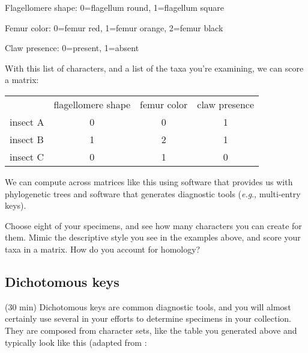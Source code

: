 Flagellomere shape:	0=flagellum round, 1=flagellum square\vspace{3mm}

Femur color: 0=femur red, 1=femur orange, 2=femur black\vspace{3mm}

Claw presence: 0=present, 1=absent\vspace{3mm}

With this list of characters, and a list of the taxa you're examining, we can score a matrix:
\begin{table}[H]
\centering
\label{my-label}
\begin{tabular}{lccc}
                             & \multicolumn{1}{l}{flagellomere shape} & \multicolumn{1}{l}{femur color} & \multicolumn{1}{l}{claw presence} \\ \cline{2-4} 
\multicolumn{1}{l|}{insect A} & \multicolumn{1}{c|}{0}                 & \multicolumn{1}{c|}{0}          & \multicolumn{1}{c|}{1}            \\ \cline{2-4} 
\multicolumn{1}{l|}{insect B} & \multicolumn{1}{c|}{1}                 & \multicolumn{1}{c|}{2}          & \multicolumn{1}{c|}{1}            \\ \cline{2-4} 
\multicolumn{1}{l|}{insect C} & \multicolumn{1}{c|}{0}                 & \multicolumn{1}{c|}{1}          & \multicolumn{1}{c|}{0}            \\ \cline{2-4} 
\end{tabular}
\end{table}

\noindent{}We can compute across matrices like this using software that provides us with phylogenetic trees and software that generates diagnostic tools (\textit{e.g}., multi-entry keys).\vspace{3mm}

\begin{theo}[systematics3] 
{}Choose eight of your specimens, and see how many characters you can create for them. Mimic the descriptive style you see in the examples above, and score your taxa in a matrix. How do you account for homology?\end{theo}

\subsection{Dichotomous keys}
(30 min) Dichotomous keys are common diagnostic tools, and you will almost certainly use several in your efforts to determine specimens in your collection. They are composed from character sets, like the table you generated above and typically look like this (adapted from \cite[][page 151]{borror1989introduction}:\vspace{3mm}

